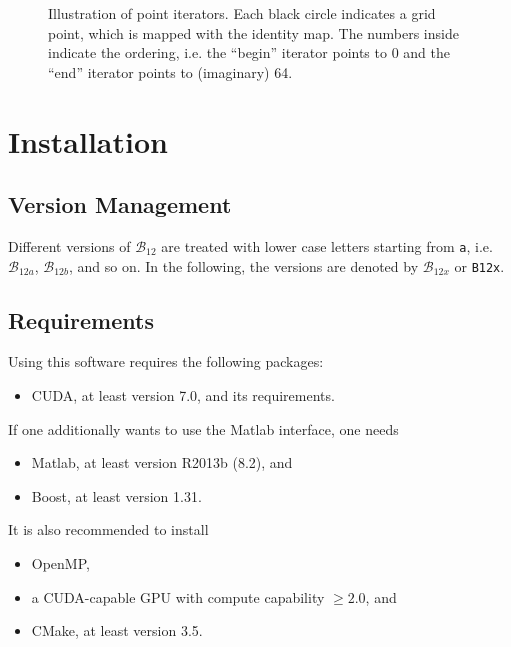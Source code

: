 \documentclass[a4paper,10pt,fleqn]{article}
\newcommand{\BTwelve}{\mathcal{B}_{12}}
\newcommand{\BTwelveVersion}[1]{\mathcal{B}_{12#1}}
\begin{document}
\begin{figure}
	\centering
	
	\caption[Illustration of point iterators]{Illustration of point iterators. Each black circle indicates a grid point, which is mapped with the identity map. The numbers inside indicate the ordering, i.e. the ``begin'' iterator points to 0 and the ``end'' iterator points to (imaginary) 64.}
	\label{fig:point_iterator}
\end{figure}



\section{Installation} \label{sec:installation}

\subsection{Version Management} \label{subsec:version_management}

Different versions of $\BTwelve$ are treated with lower case letters starting from \verb$a$, i.e. $\BTwelveVersion{a}$, $\BTwelveVersion{b}$, and so on. In the following, the versions are denoted by $\BTwelveVersion{x}$ or \verb$B12x$.

\subsection{Requirements} \label{subsec:requirements}

Using this software requires the following packages:
\begin{itemize}
\item CUDA, at least version 7.0, and its requirements.
\end{itemize}
If one additionally wants to use the Matlab interface, one needs
\begin{itemize}
\item Matlab, at least version R2013b (8.2), and
\item Boost, at least version 1.31.
\end{itemize}
It is also recommended to install
\begin{itemize}
\item OpenMP,
\item a CUDA-capable GPU with compute capability $\geq 2.0$, and
\item CMake, at least version 3.5.
\end{itemize}
\end{document}
